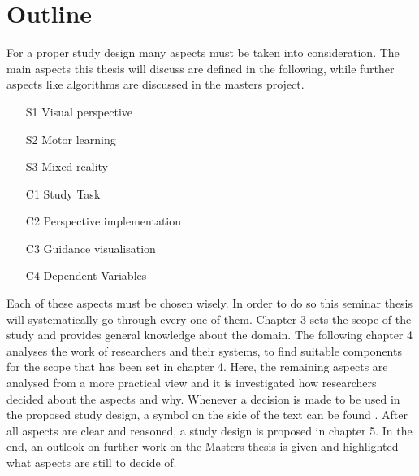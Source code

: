 \section{Outline}
For a proper study design many aspects must be taken into consideration. The main aspects this thesis will discuss are defined in the following, while further aspects like algorithms are discussed in the masters project.
\begin{itemize}
	\item[S1] Visual perspective
	\item[S2] Motor learning
	\item[S3] Mixed reality
	\item[C1] Study Task
	\item[C2] Perspective implementation
	\item[C3] Guidance visualisation
	\item[C4] Dependent Variables

\end{itemize}
Each of these aspects must be chosen wisely. In order to do so this seminar thesis will systematically go through every one of them. Chapter 3 sets the scope of the study and provides general knowledge about the domain. The following chapter 4 analyses the work of researchers and their systems, to find suitable components for the scope that has been set in chapter 4. Here, the remaining aspects are analysed from a more practical view and it is investigated how researchers decided about the aspects and why. Whenever a decision is made to be used in the proposed study design, a symbol on the side of the text can be found \markA. After all aspects are clear and reasoned, a study design is proposed in chapter 5. In the end, an outlook on further work on the Masters thesis is given and highlighted what aspects are still to decide of.


